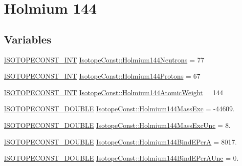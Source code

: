 \hypertarget{group___isotope_const-_holmium-_ho144}{}\section{Holmium 144}
\label{group___isotope_const-_holmium-_ho144}
\subsection*{Variables}
\begin{DoxyCompactItemize}
\item 
\mbox{\hyperlink{group___isotope_const-_macros_ga5f18360b3e99483a35c32d789e62621c}{I\+S\+O\+T\+O\+P\+E\+C\+O\+N\+S\+T\+\_\+\+I\+NT}} \mbox{\hyperlink{group___isotope_const-_holmium-_ho144_ga454126675d1ab1013dcb3e781d7d4861}{Isotope\+Const\+::\+Holmium144\+Neutrons}} = 77
\item 
\mbox{\hyperlink{group___isotope_const-_macros_ga5f18360b3e99483a35c32d789e62621c}{I\+S\+O\+T\+O\+P\+E\+C\+O\+N\+S\+T\+\_\+\+I\+NT}} \mbox{\hyperlink{group___isotope_const-_holmium-_ho144_gaa6207c4e88bc3b067ab439f70ee747f5}{Isotope\+Const\+::\+Holmium144\+Protons}} = 67
\item 
\mbox{\hyperlink{group___isotope_const-_macros_ga5f18360b3e99483a35c32d789e62621c}{I\+S\+O\+T\+O\+P\+E\+C\+O\+N\+S\+T\+\_\+\+I\+NT}} \mbox{\hyperlink{group___isotope_const-_holmium-_ho144_gaa7109e46c8a8c2fcc7e3a339cf5b1c61}{Isotope\+Const\+::\+Holmium144\+Atomic\+Weight}} = 144
\item 
\mbox{\hyperlink{group___isotope_const-_macros_ga8f45a7272ce02c0b4c65c44636ed719a}{I\+S\+O\+T\+O\+P\+E\+C\+O\+N\+S\+T\+\_\+\+D\+O\+U\+B\+LE}} \mbox{\hyperlink{group___isotope_const-_holmium-_ho144_gafd16195f24dcd22f4d23fee1fe41f209}{Isotope\+Const\+::\+Holmium144\+Mass\+Exc}} = -\/44609.
\item 
\mbox{\hyperlink{group___isotope_const-_macros_ga8f45a7272ce02c0b4c65c44636ed719a}{I\+S\+O\+T\+O\+P\+E\+C\+O\+N\+S\+T\+\_\+\+D\+O\+U\+B\+LE}} \mbox{\hyperlink{group___isotope_const-_holmium-_ho144_ga936bb2615ece181c4c55fea658822b71}{Isotope\+Const\+::\+Holmium144\+Mass\+Exc\+Unc}} = 8.
\item 
\mbox{\hyperlink{group___isotope_const-_macros_ga8f45a7272ce02c0b4c65c44636ed719a}{I\+S\+O\+T\+O\+P\+E\+C\+O\+N\+S\+T\+\_\+\+D\+O\+U\+B\+LE}} \mbox{\hyperlink{group___isotope_const-_holmium-_ho144_ga4c7e6d869436ebcc3089d4fe51deae01}{Isotope\+Const\+::\+Holmium144\+Bind\+E\+PerA}} = 8017.
\item 
\mbox{\hyperlink{group___isotope_const-_macros_ga8f45a7272ce02c0b4c65c44636ed719a}{I\+S\+O\+T\+O\+P\+E\+C\+O\+N\+S\+T\+\_\+\+D\+O\+U\+B\+LE}} \mbox{\hyperlink{group___isotope_const-_holmium-_ho144_ga0f485385a2e3829eb645d5251c3f30ac}{Isotope\+Const\+::\+Holmium144\+Bind\+E\+Per\+A\+Unc}} = 0.

\end{DoxyCompactItemize}
